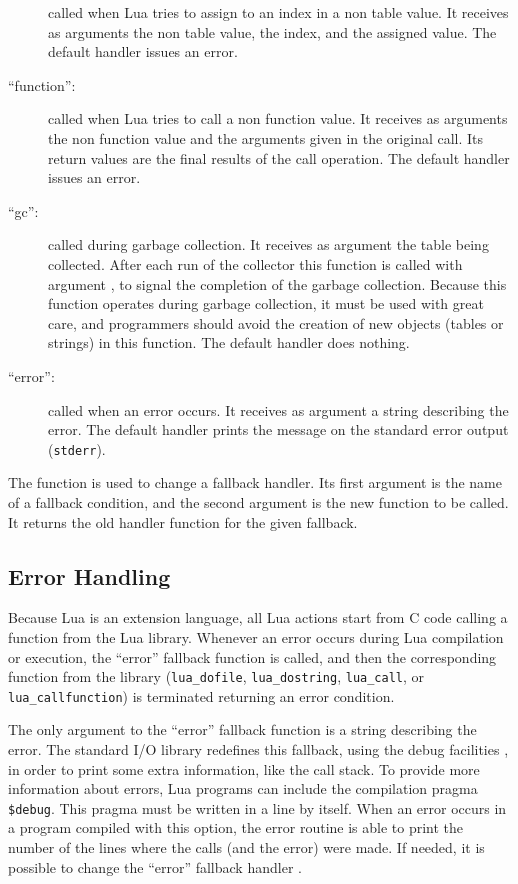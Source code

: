 \begin{description}
called when Lua tries to assign to an index in a non table value.
It receives as arguments the non table value,
the index, and the assigned value.
The default handler issues an error.
\item[``function'':]
called when Lua tries to call a non function value.
It receives as arguments the non function value and the
arguments given in the original call.
Its return values are the final results of the call operation.
The default handler issues an error.
\item[``gc'':]
called during garbage collection.
It receives as argument the table being collected.
After each run of the collector this function is called with argument \nil,
to signal the completion of the garbage collection.
Because this function operates during garbage collection,
it must be used with great care,
and programmers should avoid the creation of new objects
(tables or strings) in this function.
The default handler does nothing.
\item[``error'':]
called when an error occurs.
It receives as argument a string describing the error.
The default handler prints the message on the standard error output
(\verb|stderr|).
\end{description}

The function  is used to change a fallback handler.
Its first argument is the name of a fallback condition,
and the second argument is the new function to be called.
It returns the old handler function for the given fallback.


\subsection{Error Handling} \label{error}

Because Lua is an extension language,
all Lua actions start from C code calling a function from the Lua library.
Whenever an error occurs during Lua compilation or execution,
the ``error'' fallback function is called,
and then the corresponding function from the library
(\verb'lua_dofile', \verb'lua_dostring',
\verb'lua_call', or \verb'lua_callfunction')
is terminated returning an error condition.

The only argument to the ``error'' fallback function is a string
describing the error.
The standard I/O library redefines this fallback,
using the debug facilities ,
in order to print some extra information,
like the call stack.
To provide more information about errors,
Lua programs can include the compilation pragma \verb'$debug'.
\label{pragma}
This pragma must be written in a line by itself.
When an error occurs in a program compiled with this option,
the error routine is able to print the number of the lines where the calls
(and the error) were made.
If needed, it is possible to change the ``error'' fallback handler
.

